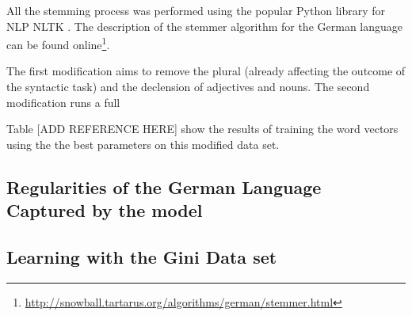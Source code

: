 All the stemming process was performed using the popular Python library for
\ac{NLP} \ac{NLTK} \cite{BirdKleinLoper09}. The
description of the stemmer algorithm for the German language can be found
online\footnote{\url{http://snowball.tartarus.org/algorithms/german/stemmer.html}}.


The first modification aims to remove the plural (already affecting the
outcome of the syntactic task) and the declension of adjectives and nouns. The second modification runs a full 

Table [ADD REFERENCE HERE] show the results of training the word vectors
using the the best parameters on this modified data set.  



\subsection{Regularities of the German Language Captured by the model}
\label{sec:sub:particularities_of_the_German_language}

\subsection{Learning with the Gini Data set}
\label{sec:learning_with_the_gini_dataset}   










 






